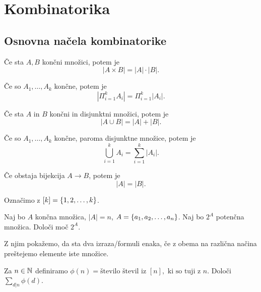 \section{Kombinatorika}
\subsection{Osnovna načela kombinatorike}
\begin{trditev}
    Če sta $A, B$ končni množici, potem je $$|A \times B| = |A| \cdot |B|.$$
\end{trditev}

\begin{trditev}
    Če so $A_1, \ldots, A_k$ končne, potem je $$|\Pi_{i=1}^k A_i| = \Pi_{i=1}^k |A_i|.$$
\end{trditev}

\begin{trditev}
    Če sta $A$ in $B$ končni in disjunktni množici, potem je $$|A \cup B| = |A| + |B|.$$
\end{trditev}

\begin{trditev}
    Če so $A_1, \ldots, A_k$ končne, paroma disjunktne množice, potem je $$\bigcup_{i=1}^k A_i = \sum_{i=1}^{k} |A_i|.$$
\end{trditev}

\begin{trditev}
    Če obstaja bijekcija $A \to B$, potem je $$|A|=|B|.$$
\end{trditev}

Označimo z $[k] = \left\{1, 2, \ldots, k\right\}$.

\begin{primer}
    Naj bo $A$ končna množica, $|A| = n$, $A = \left\{a_1, a_2, \ldots, a_n\right\}$. Naj bo $2^A$ potenčna množica. Določi moč $2^A$.
\end{primer}

\begin{trditev}
    Z njim pokažemo, da sta dva izraza/formuli enaka, če z obema na različna načina preštejemo elemente iste množice.
\end{trditev}

\begin{primer}
    Za $n \in \mathbb{N}$ definiramo $\phi(n) = \text{število števil iz } [n], \text{ ki so tuji z } n.$ Določi $\sum_{d | n} \phi(d)$.
\end{primer}

